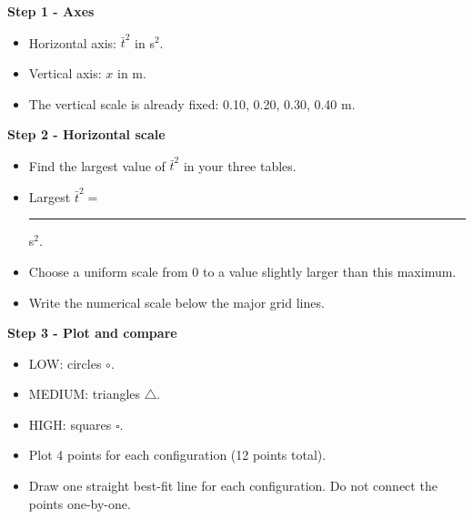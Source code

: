 \documentclass[10pt,a4paper,landscape]{article}
\newcommand{\blank}[1]{\rule{#1}{0.4pt}}
\begin{document}
\begin{minipage}[t]{0.33\textwidth}
\textbf{Step 1 - Axes}
\begin{itemize}[leftmargin=5mm,itemsep=0pt,topsep=1pt]
  \item Horizontal axis: $\bar t^2$ in s$^2$.
  \item Vertical axis: $x$ in m.
  \item The vertical scale is already fixed: 0.10, 0.20, 0.30, 0.40 m.
\end{itemize}
\end{minipage}
\begin{minipage}[t]{0.33\textwidth}
\textbf{Step 2 - Horizontal scale}
\begin{itemize}[leftmargin=5mm,itemsep=0pt,topsep=1pt]
  \item Find the largest value of $\bar t^2$ in your three tables.
  \item Largest $\bar t^2 =$ \blank{2.0cm} s$^2$.
  \item Choose a uniform scale from 0 to a value slightly larger than this maximum.
  \item Write the numerical scale below the major grid lines.
\end{itemize}
\end{minipage}
\begin{minipage}[t]{0.33\textwidth}
\textbf{Step 3 - Plot and compare}
\begin{itemize}[leftmargin=5mm,itemsep=0pt,topsep=1pt]
  \item LOW: circles $\circ$.
  \item MEDIUM: triangles $\triangle$.
  \item HIGH: squares $\square$.
  \item Plot 4 points for each configuration (12 points total).
  \item Draw one straight best-fit line for each configuration. Do not connect the points one-by-one.
\end{itemize}
\end{minipage}

\vspace{1mm}
\begin{center}
\end{center}
\end{document}
